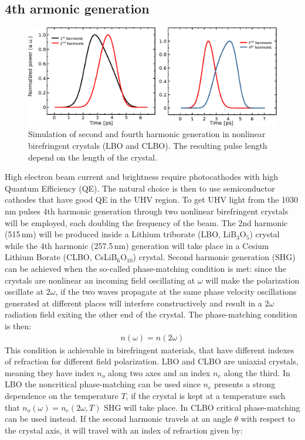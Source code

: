 \subsection{4th armonic generation}
\begin{figure}
	\centering
	\includegraphics[width=0.9\linewidth]{images/harmonic.eps}
	\caption{Simulation of second and fourth harmonic generation in nonlinear birefringent crystals (LBO and CLBO). The resulting pulse length depend on the length of the crystal.}
	\label{fig:harmonic}
\end{figure}
High electron beam current and brightness require photocathodes with high Quantum Efficiency (QE). The natural choice is then to use semiconductor cathodes that have good QE in the UHV region. To get UHV light from the 1030\,nm pulses 4th harmonic generation through two nonlinear birefringent crystals will be employed, each doubling the frequency of the beam. The 2nd harmonic (515\,nm) will be produced inside a Lithium triborate (LBO, LiB$_3$O$_5$) crystal while the 4th harmonic (257.5\,nm) generation will take place in a Cesium Lithium Borate (CLBO, CsLiB$_6$O$_10$) crystal. Second harmonic generation (SHG) can be achieved when the so-called phase-matching condition is met: since the crystals are nonlinear an incoming field oscillating at $\omega$ will make the polarization oscillate at $2\omega$, if the two waves propagate at the same phase velocity oscillations generated at different places will interfere constructively and result in a $2\omega$ radiation field exiting the other end of the crystal. The phase-matching condition is then:
\begin{align}
n(\omega) = n(2\omega)
\end{align}
This condition is achievable in birefringent materials, that have different indexes of refraction for different field polarization. LBO and CLBO are uniaxial crystals, meaning they have index $n_o$ along two axes and an index $n_e$ along the third. In LBO the noncritical phase-matching can be used since $n_e$ presents a strong dependence on the temperature $T$, if the crystal is kept at a temperature such that $n_o(\omega) = n_e(2\omega,T)$ SHG will take place. In CLBO critical phase-matching can be used instead. If the second harmonic travels at an angle $\theta$ with respect to the crystal axis, it will travel with an index of refraction given by:
